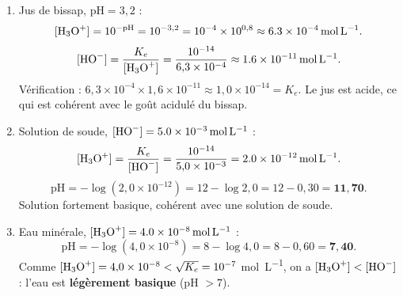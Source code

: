 \documentclass[11pt]{article}
\begin{document}
\begin{corrige}
\begin{enumerate}
\item Jus de bissap, $\mathrm{pH} = 3{,}2$ :
\[ [\ce{H3O+}] = 10^{-\mathrm{pH}} = 10^{-3{,}2} = 10^{-4} \times 10^{0{,}8} \approx \SI{6,3e-4}{mol.L^{-1}}. \]
\[ [\ce{HO-}] = \frac{K_e}{[\ce{H3O+}]} = \frac{10^{-14}}{6{,}3\times10^{-4}} \approx \SI{1,6e-11}{mol.L^{-1}}. \]
Vérification : $6{,}3\times10^{-4} \times 1{,}6\times10^{-11} \approx 1{,}0\times10^{-14} = K_e$. Le jus est acide, ce qui est cohérent avec le goût acidulé du bissap.
\item Solution de soude, $[\ce{HO-}] = \SI{5,0e-3}{mol.L^{-1}}$ :
\[ [\ce{H3O+}] = \frac{K_e}{[\ce{HO-}]} = \frac{10^{-14}}{5{,}0\times10^{-3}} = \SI{2,0e-12}{mol.L^{-1}}. \]
\[ \mathrm{pH} = -\log(2{,}0\times10^{-12}) = 12 - \log 2{,}0 = 12 - 0{,}30 = \mathbf{11{,}70}. \]
Solution fortement basique, cohérent avec une solution de soude.
\item Eau minérale, $[\ce{H3O+}] = \SI{4,0e-8}{mol.L^{-1}}$ :
\[ \mathrm{pH} = -\log(4{,}0\times10^{-8}) = 8 - \log 4{,}0 = 8 - 0{,}60 = \mathbf{7{,}40}. \]
Comme $[\ce{H3O+}] = 4{,}0\times10^{-8} < \sqrt{K_e} = 10^{-7}$ \si{mol.L^{-1}}, on a $[\ce{H3O+}] < [\ce{HO-}]$ : l'eau est \textbf{légèrement basique} (pH $> 7$).
\end{enumerate}
\end{corrige}
\end{document}

